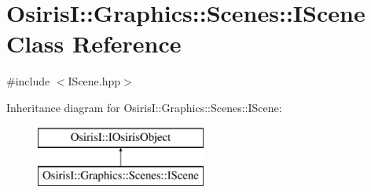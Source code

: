 \hypertarget{class_osiris_i_1_1_graphics_1_1_scenes_1_1_i_scene}{\section{Osiris\-I\-:\-:Graphics\-:\-:Scenes\-:\-:I\-Scene Class Reference}
\label{class_osiris_i_1_1_graphics_1_1_scenes_1_1_i_scene}
}


{\ttfamily \#include $<$I\-Scene.\-hpp$>$}

Inheritance diagram for Osiris\-I\-:\-:Graphics\-:\-:Scenes\-:\-:I\-Scene\-:\begin{figure}[H]
\begin{center}
\leavevmode
\includegraphics[height=2.000000cm]{class_osiris_i_1_1_graphics_1_1_scenes_1_1_i_scene}
\end{center}
\end{figure}
